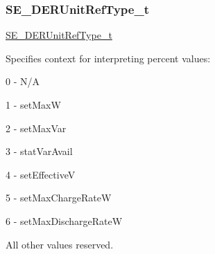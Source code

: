 \subsubsection{\texorpdfstring{S\+E\+\_\+\+D\+E\+R\+Unit\+Ref\+Type\+\_\+t}{SE\_DERUnitRefType\_t}}
{\footnotesize\ttfamily \hyperlink{group__DERUnitRefType_gaff0b9dcda4cd888095dba6d262e5ce86}{S\+E\+\_\+\+D\+E\+R\+Unit\+Ref\+Type\+\_\+t}}

Specifies context for interpreting percent values\+:

0 -\/ N/A

1 -\/ set\+MaxW

2 -\/ set\+Max\+Var

3 -\/ stat\+Var\+Avail

4 -\/ set\+EffectiveV

5 -\/ set\+Max\+Charge\+RateW

6 -\/ set\+Max\+Discharge\+RateW

All other values reserved. 